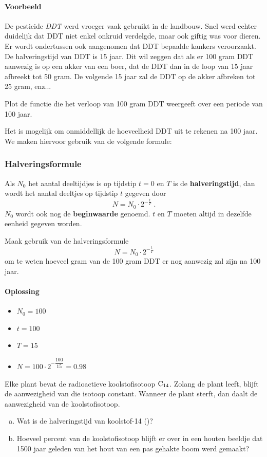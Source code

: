 \documentclass[12pt,twoside,a4paper]{article}
\begin{document}
\paragraph*{Voorbeeld}
De pesticide {\em DDT} werd vroeger vaak gebruikt in de landbouw. Snel werd echter duidelijk dat DDT niet enkel onkruid verdelgde, maar ook giftig was voor dieren. Er wordt ondertussen ook aangenomen dat DDT bepaalde kankers veroorzaakt. De halveringstijd van DDT is 15 jaar. Dit wil zeggen dat als er 100 gram DDT aanwezig is op een akker van een boer, dat de DDT dan in de loop van 15 jaar afbreekt tot 50 gram. De volgende 15 jaar zal de DDT op de akker afbreken tot 25 gram, enz...

Plot de functie die het verloop van 100 gram DDT  weergeeft over een periode van 100 jaar.
\begin{center}
\visgraad{12cm}
\end{center}

Het is mogelijk om onmiddellijk de hoeveelheid DDT uit te rekenen na 100 jaar. We maken hiervoor gebruik van de volgende formule:

\subsubsection*{Halveringsformule}
\begin{mdframed}
Als $N_0$ het aantal deeltijdjes is op tijdstip $t=0$ en $T$ is de {\bf halveringstijd}, dan wordt het aantal deeltjes op tijdstip $t$ gegeven door
$$N=N_0\cdot2^{-\frac{t}{T}}\;.$$
$N_0$ wordt ook nog de {\bf beginwaarde} genoemd. $t$ en $T$ moeten altijd in dezelfde eenheid gegeven worden.
\end{mdframed}

Maak gebruik van de halveringsformule
$$N=N_0\cdot2^{-\frac{t}{T}}$$
om te weten hoeveel gram van de 100 gram DDT er nog aanwezig zal zijn na 100 jaar.
\paragraph*{Oplossing}
\begin{itemize}
  \itemsep1em
  \item $N_0=100$
  \item $t = 100$
  \item $T = 15$
  \item $N = 100 \cdot 2^{-\dfrac{100}{15}} =0.98$
\end{itemize}

\begin{oefening}
Elke plant bevat de radioactieve koolstofisotoop $\ce{C14}$. Zolang de plant leeft, blijft de aanwezigheid van die isotoop constant. Wanneer de plant sterft, dan daalt de aanwezigheid van de koolstofisotoop.
\begin{enumerate}[(a)]
  \item Wat is de halveringstijd van koolstof-14 ()?
  \item Hoeveel percent van de koolstofisotoop  blijft er over in een houten beeldje dat 1500 jaar geleden van het hout van een pas gehakte boom werd gemaakt?
\end{enumerate}
\end{oefening}
\end{document}
